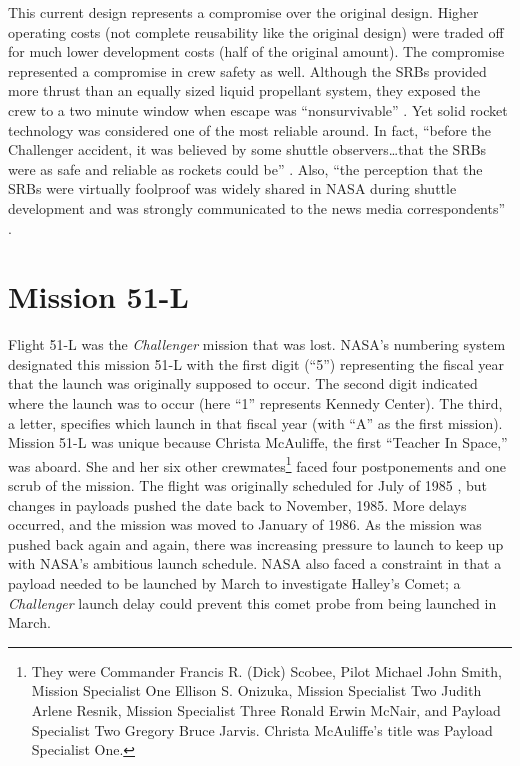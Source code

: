 This current design represents a compromise over the original design. Higher operating costs (not complete reusability like the original design) were traded off for much lower development costs (half of the original amount). The compromise represented a compromise in crew safety as well. Although the SRBs provided more thrust than an equally sized liquid propellant system, they exposed the crew to a two minute window when escape was ``nonsurvivable'' \cite[p. 59]{lewis}. Yet solid rocket technology was considered one of the most reliable around. In fact, ``before the Challenger accident, it was believed by some shuttle observers\ldots that the SRBs were as safe and reliable as rockets could be'' \cite[pp. 63--64]{lewis}. Also, ``the perception that the SRBs were virtually foolproof was widely shared in NASA during shuttle development and was strongly communicated to the news media correspondents'' \cite[p. 64]{lewis}.

\section{Mission 51-L}

Flight 51-L was the {\em Challenger} mission that was lost. NASA's numbering system designated this mission 51-L with the first digit (``5'') representing the fiscal year that the launch was originally supposed to occur. The second digit indicated where the launch was to occur (here ``1'' represents Kennedy Center). The third, a letter, specifies which launch in that fiscal year (with ``A'' as the first mission). Mission 51-L was unique because Christa McAuliffe, the first ``Teacher In Space,'' was aboard. She and her six other crewmates\footnote{They were Commander Francis R. (Dick) Scobee, Pilot Michael John Smith, Mission Specialist One Ellison S. Onizuka, Mission Specialist Two Judith Arlene Resnik, Mission Specialist Three Ronald Erwin McNair, and Payload Specialist Two Gregory Bruce Jarvis. Christa McAuliffe's title was Payload Specialist One.} faced four postponements and one scrub of the mission. The flight was originally scheduled for July of 1985 \cite[vol. 1, p. 10]{rogers}, but changes in payloads pushed the date back to November, 1985. More delays occurred, and the mission was moved to January of 1986. As the mission was pushed back again and again, there was increasing pressure to launch to keep up with NASA's ambitious launch schedule. NASA also faced a constraint in that a payload needed to be launched by March to investigate Halley's Comet; a {\em Challenger} launch delay could prevent this comet probe from being launched in March.

